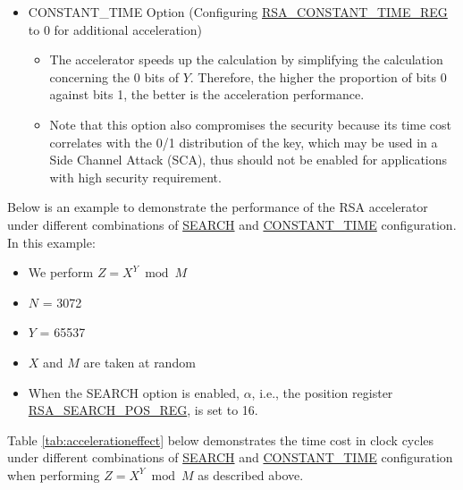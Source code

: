 \documentclass[main\_\_EN.tex]{subfiles}
\begin{document}
\begin{itemize}
\item CONSTANT\_TIME Option (Configuring \hyperref[regdesc:RSACONSTANTTIMEREG]{RSA\_CONSTANT\_TIME\_REG} to 0 for additional acceleration)
    \begin{itemize}
        \item The accelerator speeds up the calculation by simplifying the calculation concerning the 0 bits of \begin{math} Y\end{math}. Therefore, the higher the proportion of bits 0 against bits 1, the better is the acceleration performance.
        \item Note that this option also compromises the security because its time cost correlates with the 0/1 distribution of the key, which may be used in a Side Channel Attack (SCA), thus should not be enabled for applications with high security requirement.
    \end{itemize}
\end{itemize}

Below is an example to demonstrate the performance of the RSA accelerator under different combinations of \hyperref[regdesc:RSASEARCHENABLEREG]{SEARCH} and \hyperref[regdesc:RSACONSTANTTIMEREG]{CONSTANT\_TIME} configuration. \\
In this example:
\begin{itemize}
    \item We perform \begin{math}Z = X^{Y} \bmod M\end{math}
    \item \begin{math}N\end{math} = 3072
    \item \begin{math}Y\end{math} = 65537
    \item \begin{math}X\end{math} and \begin{math}M\end{math} are taken at random
    \item When the SEARCH option is enabled, \begin{math} \alpha \end{math}, i.e., the position register \hyperref[regdesc:RSASEARCHPOSREG]{RSA\_SEARCH\_POS\_REG}, is set to 16.
\end{itemize}

Table \ref{tab:accelerationeffect} below demonstrates the time cost in clock cycles under different combinations of \hyperref[regdesc:RSASEARCHENABLEREG]{SEARCH} and \hyperref[regdesc:RSACONSTANTTIMEREG]{CONSTANT\_TIME} configuration when performing \begin{math}Z = X^{Y} \bmod M\end{math} as described above.
\end{document}

